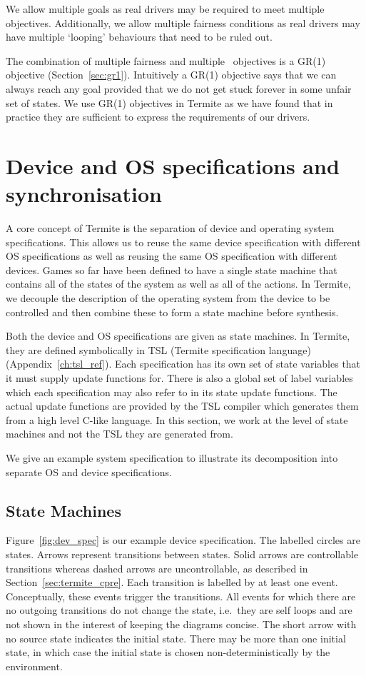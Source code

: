 We allow multiple goals as real drivers may be required to meet multiple objectives. Additionally, we allow multiple fairness conditions as real drivers may have multiple `looping' behaviours that need to be ruled out.

The combination of multiple fairness and multiple \buchi\ objectives is a GR(1) objective (Section~\ref{sec:gr1}). Intuitively a GR(1) objective says that we can always reach any goal provided that we do not get stuck forever in some unfair set of states. We use GR(1) objectives in Termite as we have found that in practice they are sufficient to express the requirements of our drivers.

\section{Device and OS specifications and synchronisation}
\label{sec:composition}

A core concept of Termite is the separation of device and operating system specifications. This allows us to reuse the same device specification with different OS specifications as well as reusing the same OS specification with different devices. Games so far have been defined to have a single state machine that contains all of the states of the system as well as all of the actions. In Termite, we decouple the description of the operating system from the device to be controlled and then combine these to form a state machine before synthesis.

Both the device and OS specifications are given as state machines. In Termite, they are defined symbolically in TSL (Termite specification language) (Appendix~\ref{ch:tsl_ref}). Each specification has its own set of state variables that it must supply update functions for. There is also a global set of label variables which each specification may also refer to in its state update functions. The actual update functions are provided by the TSL compiler which generates them from a high level C-like language. In this section, we work at the level of state machines and not the TSL they are generated from.

We give an example system specification to illustrate its decomposition into separate OS and device specifications. 

\subsection{State Machines}

Figure~\ref{fig:dev_spec} is our example device specification. The labelled circles are states. Arrows represent transitions between states. Solid arrows are controllable transitions whereas dashed arrows are uncontrollable, as described in Section~\ref{sec:termite_cpre}. Each transition is labelled by at least one event. Conceptually, these events trigger the transitions. All events for which there are no outgoing transitions do not change the state, i.e.\ they are self loops and are not shown in the interest of keeping the diagrams concise. The short arrow with no source state indicates the initial state. There may be more than one initial state, in which case the initial state is chosen non-deterministically by the environment.

